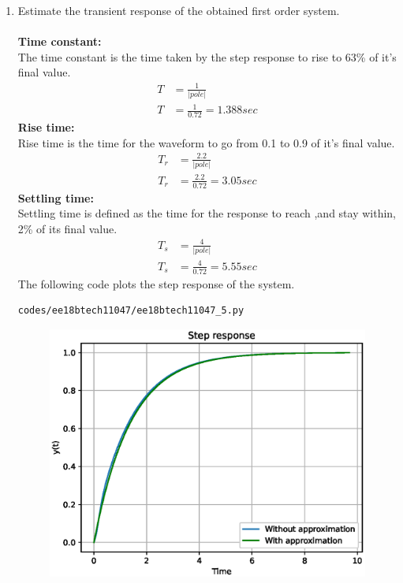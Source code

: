 \begin{enumerate}[label=\thesubsection.\arabic*.,ref=\thesubsection.\theenumi]
\item Estimate the transient response of the obtained first order system.\\
\solution\\
\textbf{Time constant:}\\
The time constant is the time taken by the step response to rise to 63\% of it's final value.
\begin{align}
T &= \frac{1}{|pole|}\\
T &= \frac{1}{0.72} = 1.388 sec
\end{align}
\textbf{Rise time:}\\
Rise time is the time for the waveform to go from 0.1 to 0.9 of it's final value.
\begin{align}
T_{r} &= \frac{2.2}{|pole|}\\
T_{r} &= \frac{2.2}{0.72} = 3.05 sec
\end{align}
\textbf{Settling time:}\\
Settling time is defined as the time for the response to reach ,and stay within, 2\% of its final value.
\begin{align}
T_{s} &= \frac{4}{|pole|}\\
T_{s} &= \frac{4}{0.72}=5.55 sec
\end{align}
The following code plots the step response of the system.
\begin{lstlisting}
codes/ee18btech11047/ee18btech11047_5.py
\end{lstlisting}
\begin{figure}[!ht]
\centering
\includegraphics[width=\columnwidth]{./figs/ee18btech11047/ee18btech11047_4.eps}
\caption{}
\label{fig:ee18btech11047_4}
\end{figure}
\end{enumerate}
